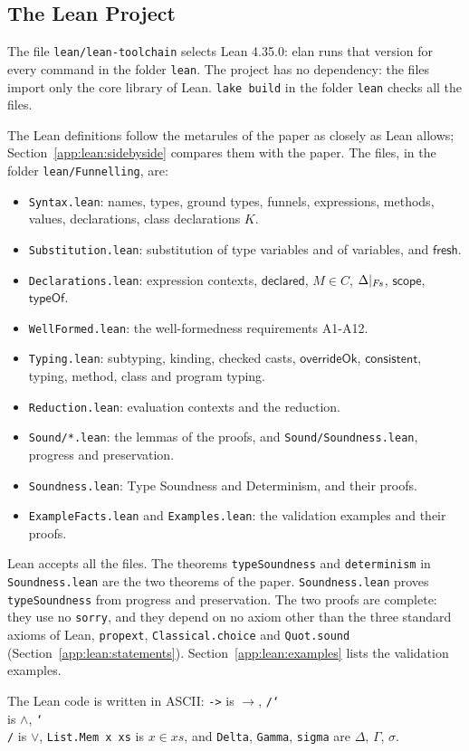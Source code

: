 \subsection{The Lean Project}
\begin{sloppypar}
The file \texttt{lean/lean-toolchain} selects Lean 4.35.0: elan runs that version for every command in the folder \texttt{lean}.
The project has no dependency: the files import only the core library of Lean.
\texttt{lake build} in the folder \texttt{lean} checks all the files.

The Lean definitions follow the metarules of the paper as closely as Lean allows; Section~\ref{app:lean:sidebyside} compares them with the paper.
The files, in the folder \texttt{lean/Funnelling}, are:
\begin{itemize}
\item \texttt{Syntax.lean}: names, types, ground types, funnels, expressions, methods, values, declarations, class declarations $K$.
\item \texttt{Substitution.lean}: substitution of type variables and of variables, and $\mathsf{fresh}$.
\item \texttt{Declarations.lean}: expression contexts, $\mathsf{declared}$, $M\in C$, $\Delta|_{F\mkern-2mu s}$, $\mathsf{scope}$, $\mathsf{typeOf}$.
\item \texttt{WellFormed.lean}: the well-formedness requirements A1-A12.
\item \texttt{Typing.lean}: subtyping, kinding, checked casts, $\mathsf{overrideOk}$, $\mathsf{consistent}$, typing, method, class and program typing.
\item \texttt{Reduction.lean}: evaluation contexts and the reduction.
\item \texttt{Sound/*.lean}: the lemmas of the proofs, and \texttt{Sound/Soundness.lean}, progress and preservation.
\item \texttt{Soundness.lean}: Type Soundness and Determinism, and their proofs.
\item \texttt{ExampleFacts.lean} and \texttt{Examples.lean}: the validation examples and their proofs.
\end{itemize}
Lean accepts all the files.
The theorems \texttt{typeSoundness} and \texttt{determinism} in \texttt{Soundness.lean} are the two theorems of the paper.
\texttt{Soundness.lean} proves \texttt{typeSoundness} from progress and preservation.
The two proofs are complete: they use no \texttt{sorry}, and they depend on no axiom other than the three standard axioms of Lean, \texttt{propext}, \texttt{Classical.choice} and \texttt{Quot.sound} (Section~\ref{app:lean:statements}).
Section~\ref{app:lean:examples} lists the validation examples.

The Lean code is written in ASCII:
\texttt{->} is $\rightarrow$, \texttt{/\char`\\} is $\wedge$, \texttt{\char`\\/} is $\vee$, \texttt{List.Mem x xs} is $x\in xs$, and \texttt{Delta}, \texttt{Gamma}, \texttt{sigma} are $\Delta$, $\Gamma$, $\sigma$.
\end{sloppypar}

